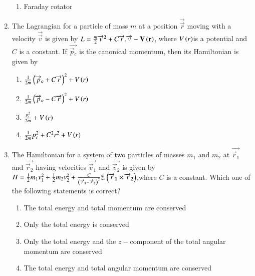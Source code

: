 \documentclass[journal]{IEEEtran}
\begin{document}
\begin{enumerate}
\begin{multicols}{2}
\begin{enumerate}
    \item Faraday rotator
\end{enumerate}
\end{multicols}
\item The Lagrangian for a particle of mass $m$ at a position $\vec{\overrightarrow{r}}$ moving with a velocity $\vec{\overrightarrow{v}}$ is given by $L = \frac{m}{2}\mathbf{\overrightarrow{v}^2} + C\mathbf{\overrightarrow{r}.\mathbf{\overrightarrow{v} - V\left(r\right)}}$, where $V\left(r\right)$is a potential and $C$ is a constant. If $\vec{\overrightarrow{p}{_c}}$ is the canonical momentum, then its Hamiltonian is given by
\begin{multicols}{2}
\begin{enumerate}
    \item $\frac{1}{2m}\left(\mathbf{\overrightarrow{p}_c} + C\mathbf{\overrightarrow{r}}\right)^2 + V\left(r\right)$
    \item $\frac{1}{2m}\left(\mathbf{\overrightarrow{p}_c} - C\mathbf{\overrightarrow{r}}\right)^2 + V\left(r\right)$
    \item $\frac{p_c^2}{2m} + V\left(r\right)$
    \item $\frac{1}{2m}p_c^2 + C^2r^2 + V\left(r\right)$
\end{enumerate}
\end{multicols}
\item The Hamiltonian for a system of two particles of masses $m_1$ and $m_2$ at $\vec{\overrightarrow{r}{_1}}$ and $\vec{\overrightarrow{r}{_2}}$ having velocities $\vec{\overrightarrow{v}{_1}}$ and $\vec{\overrightarrow{v}{_2}}$ is given by $H = \frac{1}{2}m_1v_1^2 + \frac{1}{2}m_2v_2^2 + \frac{C}{\left(\mathbf{\overrightarrow{r}{_1} - \mathbf{\overrightarrow{r}{_2}}}\right)^2}\hat{z}.\left(\mathbf{\overrightarrow{r}{_1}}\times\mathbf{\overrightarrow{r}{_2}}\right)$,where $C$ is a constant. Which one of the following statements is correct?
\begin{enumerate}
    \item The total energy and total momentum are conserved 
    \item Only the total energy is conserved
    \item Only the total energy and the $z-$component of the total angular momentum are conserved 
    \item The total energy and total angular momentum are conserved
\end{enumerate}

\end{enumerate}

 
\end{document}
